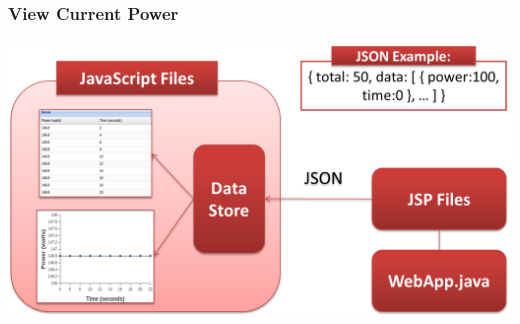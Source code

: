 \documentclass{beamer}
\begin{document}
\begin{frame}
  \frametitle{View Current Power}

  \includegraphics[width=\textwidth,keepaspectratio]{json.png}

\end{frame}
\end{document}
